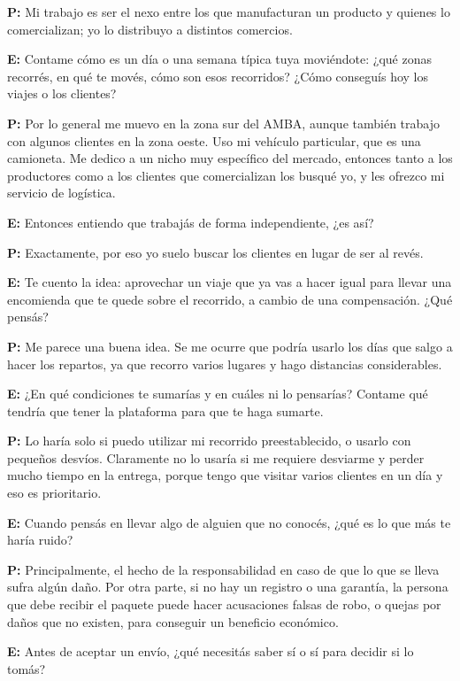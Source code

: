 {\noindent\textbf{P:} Mi trabajo es ser el nexo entre los que manufacturan un producto y quienes lo comercializan; yo lo distribuyo a distintos comercios.

\noindent\textbf{E:} Contame cómo es un día o una semana típica tuya moviéndote: ¿qué zonas recorrés, en qué te movés, cómo son esos recorridos? ¿Cómo conseguís hoy los viajes o los clientes?

\noindent\textbf{P:} Por lo general me muevo en la zona sur del AMBA, aunque también trabajo con algunos clientes en la zona oeste. Uso mi vehículo particular, que es una camioneta. Me dedico a un nicho muy específico del mercado, entonces tanto a los productores como a los clientes que comercializan los busqué yo, y les ofrezco mi servicio de logística.

\noindent\textbf{E:} Entonces entiendo que trabajás de forma independiente, ¿es así?

\noindent\textbf{P:} Exactamente, por eso yo suelo buscar los clientes en lugar de ser al revés.

\noindent\textbf{E:} Te cuento la idea: aprovechar un viaje que ya vas a hacer igual para llevar una encomienda que te quede sobre el recorrido, a cambio de una compensación. ¿Qué pensás?

\noindent\textbf{P:} Me parece una buena idea. Se me ocurre que podría usarlo los días que salgo a hacer los repartos, ya que recorro varios lugares y hago distancias considerables.

\noindent\textbf{E:} ¿En qué condiciones te sumarías y en cuáles ni lo pensarías? Contame qué tendría que tener la plataforma para que te haga sumarte.

\noindent\textbf{P:} Lo haría solo si puedo utilizar mi recorrido preestablecido, o usarlo con pequeños desvíos. Claramente no lo usaría si me requiere desviarme y perder mucho tiempo en la entrega, porque tengo que visitar varios clientes en un día y eso es prioritario.

\noindent\textbf{E:} Cuando pensás en llevar algo de alguien que no conocés, ¿qué es lo que más te haría ruido?

\noindent\textbf{P:} Principalmente, el hecho de la responsabilidad en caso de que lo que se lleva sufra algún daño. Por otra parte, si no hay un registro o una garantía, la persona que debe recibir el paquete puede hacer acusaciones falsas de robo, o quejas por daños que no existen, para conseguir un beneficio económico.

\noindent\textbf{E:} Antes de aceptar un envío, ¿qué necesitás saber sí o sí para decidir si lo tomás?

}
